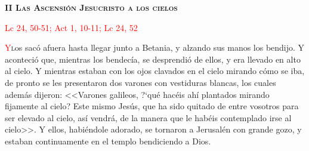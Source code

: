 \begin{center}
    \textbf{\textsc{II Las Ascensión Jesucristo a los cielos}}
    
    \textcolor{red}{Lc 24, 50-51; Act 1, 10-11; Lc 24, 52 }
\end{center}

\vspace{0.25em}

\lettrine[lines=2]{\textcolor{red}{Y}} los sacó afuera hasta llegar junto a Betania, y alzando sus manos los bendijo. Y aconteció que, mientras
los bendecía, se desprendió de ellos, y era llevado en alto al cielo. Y mientras estaban con los ojos clavados en el cielo mirando cómo se iba,
de pronto se les presentaron dos varones con vestiduras blancas, los cuales además dijeron: <<Varones galileos, {?`}qué hacéis ahí plantados
mirando fijamente al cielo? Este mismo Jesús, que ha sido quitado de entre vosotros para ser elevado al cielo, así vendrá, de la manera que
le habéis contemplado irse al cielo>>. Y ellos, habiéndole adorado, se tornaron a Jerusalén con grande gozo, y estaban continuamente en 
el templo bendiciendo a Dios.